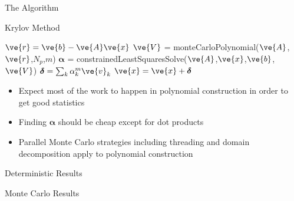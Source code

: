 \documentclass{beamer}
\begin{document}
\begin{frame}[fragile]{The Algorithm}

  \begin{algorithm}[H]
    \caption{Krylov Method}
    \begin{algorithmic}[1]
      \STATE $\ve{r} = \ve{b} - \ve{A}\ve{x}$
      \STATE $\ve{V}$ = monteCarloPolynomial($\ve{A}$,$\ve{r}$,$N_p$,$m$)
      \STATE $\boldsymbol{\alpha}$ = constrainedLeastSquaresSolve($\ve{A}$,$\ve{x}$,$\ve{b}$,$\ve{V}$)
      \STATE $\boldsymbol{\delta} = \sum_k \alpha_k^m \ve{v}_k$
      \STATE $\ve{x} = \ve{x} + \boldsymbol{\delta}$
      \ENDWHILE
    \end{algorithmic}
  \end{algorithm}

  \begin{itemize}
  \item Expect most of the work to happen in polynomial construction
    in order to get good statistics
  \item Finding $\boldsymbol{\alpha}$ should be cheap except for dot
    products
  \item Parallel Monte Carlo strategies including threading and domain
    decomposition apply to polynomial construction
  \end{itemize}

\end{frame}

\begin{frame}{Deterministic Results}

\end{frame}

\begin{frame}{Monte Carlo Results}

\end{frame}
\end{document}
